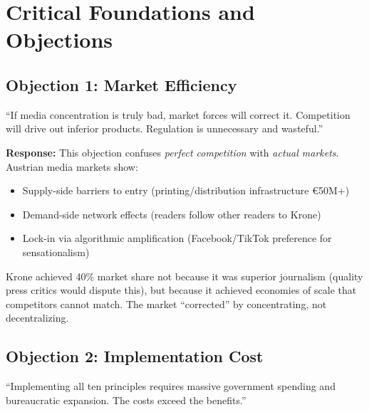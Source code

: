 \section{Critical Foundations and Objections}
\label{sec:bf-foundations}

\subsection{Objection 1: Market Efficiency}

\begin{tcolorbox}[colback=red!5!white, colframe=red!50!black,
    title=Objection: Markets Are Self-Correcting]

``If media concentration is truly bad, market forces will correct it. Competition will drive out inferior products. Regulation is unnecessary and wasteful.''

\end{tcolorbox}

\textbf{Response:} This objection confuses \textit{perfect competition} with \textit{actual markets}. Austrian media markets show:
\begin{itemize}
\item Supply-side barriers to entry (printing/distribution infrastructure €50M+)
\item Demand-side network effects (readers follow other readers to Krone)
\item Lock-in via algorithmic amplification (Facebook/TikTok preference for sensationalism)
\end{itemize}

Krone achieved 40\% market share not because it was superior journalism (quality press critics would dispute this), but because it achieved economies of scale that competitors cannot match. The market ``corrected'' by concentrating, not decentralizing.

\subsection{Objection 2: Implementation Cost}

\begin{tcolorbox}[colback=red!5!white, colframe=red!50!black,
    title=Objection: Regulation Is Expensive and Bureaucratic]

``Implementing all ten principles requires massive government spending and bureaucratic expansion. The costs exceed the benefits.''

\end{tcolorbox}

